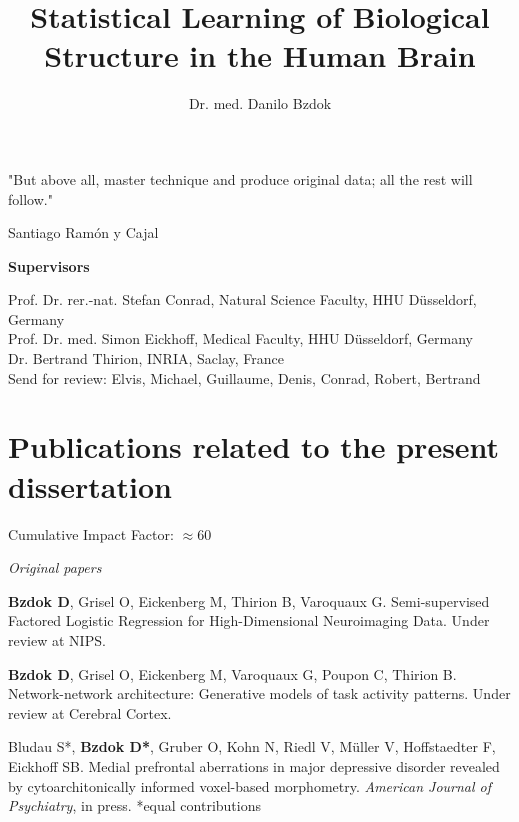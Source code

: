 \documentclass[authoryear,review,3p]{elsarticle}
\begin{document}
\begin{frontmatter}

\title{Statistical Learning of Biological Structure in the Human Brain}

\author{Dr. med. Danilo Bzdok}

\end{frontmatter}

\bigskip
\bigskip
\bigskip
\centerline{
"But above all, master technique and produce original data; 
all the rest will follow."}
\centerline{Santiago Ram\'{o}n y Cajal}

\bigskip
\bigskip
\bigskip

\textbf{Supervisors\\}

Prof. Dr. rer.-nat. Stefan Conrad, Natural Science Faculty, HHU D\"usseldorf, Germany\\

Prof. Dr. med. Simon Eickhoff, Medical Faculty, HHU D\"usseldorf, Germany\\

Dr. Bertrand Thirion, INRIA, Saclay, France\\


Send for review:
Elvis, Michael, Guillaume, Denis, Conrad, Robert,
Bertrand


\bigskip

\newpage
\section*{Publications related to the present dissertation}

\linebreak
Cumulative Impact Factor: $\approx$60

\linebreak
\textit{Original papers}

\textbf{Bzdok D}, Grisel O, Eickenberg M, Thirion B, Varoquaux G.
Semi-supervised Factored Logistic Regression for High-Dimensional
Neuroimaging Data. Under review at NIPS.

\textbf{Bzdok D}, Grisel O, Eickenberg M, Varoquaux G, Poupon C, Thirion B.
Network-network architecture: Generative models of task activity patterns.
Under review at Cerebral Cortex.

Bludau S*, \textbf{Bzdok D*}, Gruber O,
Kohn N, Riedl V, Müller V, Hoffstaedter F, Eickhoff SB.
Medial prefrontal aberrations in major depressive disorder
revealed by cytoarchitonically informed voxel-based morphometry.
\textit{American Journal of Psychiatry}, in press. *equal contributions
\end{document}
